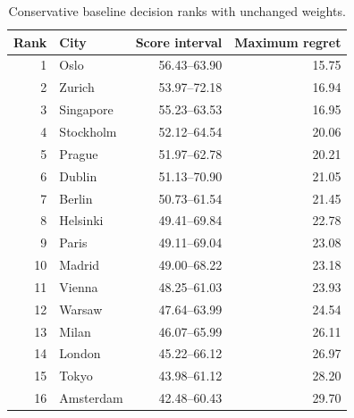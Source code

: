 \begin{table}[!ht]\centering
\caption{Conservative baseline decision ranks with unchanged weights.}\label{tab:baseline}
\begin{tabular}{rlrr}\toprule
Rank & City & Score interval & Maximum regret\\\midrule
1 & Oslo & 56.43--63.90 & 15.75 \\
2 & Zurich & 53.97--72.18 & 16.94 \\
3 & Singapore & 55.23--63.53 & 16.95 \\
4 & Stockholm & 52.12--64.54 & 20.06 \\
5 & Prague & 51.97--62.78 & 20.21 \\
6 & Dublin & 51.13--70.90 & 21.05 \\
7 & Berlin & 50.73--61.54 & 21.45 \\
8 & Helsinki & 49.41--69.84 & 22.78 \\
9 & Paris & 49.11--69.04 & 23.08 \\
10 & Madrid & 49.00--68.22 & 23.18 \\
11 & Vienna & 48.25--61.03 & 23.93 \\
12 & Warsaw & 47.64--63.99 & 24.54 \\
13 & Milan & 46.07--65.99 & 26.11 \\
14 & London & 45.22--66.12 & 26.97 \\
15 & Tokyo & 43.98--61.12 & 28.20 \\
16 & Amsterdam & 42.48--60.43 & 29.70 \\
\bottomrule\end{tabular}\end{table}

